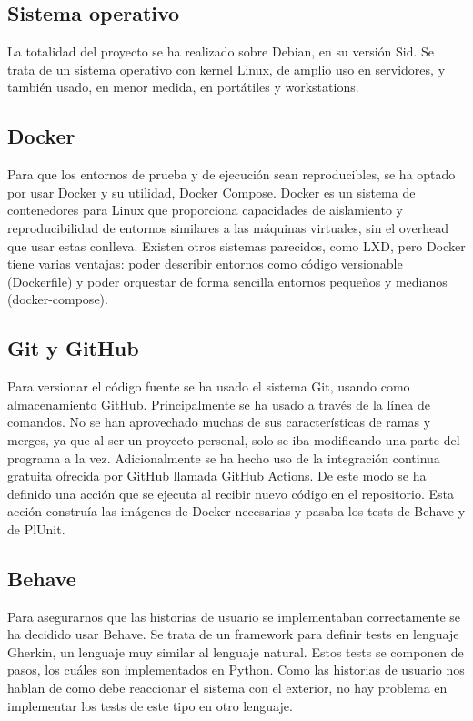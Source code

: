 \documentclass[12pt]{report} %
\begin{document}
\subsection{Sistema operativo}
La totalidad del proyecto se ha realizado sobre Debian, en su versión Sid. Se trata de un sistema operativo con kernel Linux, 
de amplio uso en servidores, y también usado, en menor medida, en portátiles y workstations.

\subsection{Docker}
Para que los entornos de prueba y de ejecución sean reproducibles, se ha optado por usar Docker y su utilidad, Docker Compose.
Docker es un sistema de contenedores para Linux que proporciona capacidades de aislamiento y reproducibilidad de entornos similares a las máquinas virtuales, sin el overhead que usar estas conlleva.
Existen otros sistemas parecidos, como LXD, pero Docker tiene varias ventajas: poder describir entornos como código versionable (Dockerfile) y poder orquestar de forma sencilla entornos pequeños y medianos (docker-compose).

\subsection{Git y GitHub}
Para versionar el código fuente se ha usado el sistema Git, usando como almacenamiento GitHub. Principalmente se ha usado a través de la línea de comandos.
No se han aprovechado muchas de sus características de ramas y merges, ya que al ser un proyecto personal, solo se iba modificando una parte del programa a la vez.
Adicionalmente se ha hecho uso de la integración continua gratuita ofrecida por GitHub llamada GitHub Actions. De este modo se ha definido una acción que se ejecuta al recibir nuevo código en el repositorio.
Esta acción construía las imágenes de Docker necesarias y pasaba los tests de Behave y de PlUnit.

\subsection{Behave}
Para asegurarnos que las historias de usuario se implementaban correctamente se ha decidido usar Behave.
Se trata de un framework para definir tests en lenguaje Gherkin, un lenguaje muy similar al lenguaje natural. Estos tests se componen de pasos,
los cuáles son implementados en Python. Como las historias de usuario nos hablan de como debe reaccionar el sistema con el exterior, no hay problema en implementar los tests de este tipo en otro lenguaje.
\end{document}
